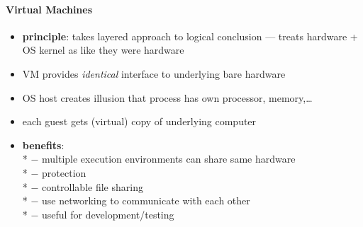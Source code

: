 \paragraph{Virtual Machines}
\begin{itemize}
  \item \textbf{principle}: takes layered approach to logical conclusion --- treats hardware + OS kernel as like they were hardware
  \item VM provides \emph{identical} interface to underlying bare hardware
  \item OS host creates illusion that process has own processor, memory,\dots
  \item each guest gets (virtual) copy of underlying computer
  \item \textbf{benefits}: \\*
    $ - $ multiple execution environments can share same hardware \\*
    $ - $ protection \\*
    $ - $ controllable file sharing \\*
    $ - $ use networking to communicate with each other \\*
    $ - $ useful for development/testing
\end{itemize}